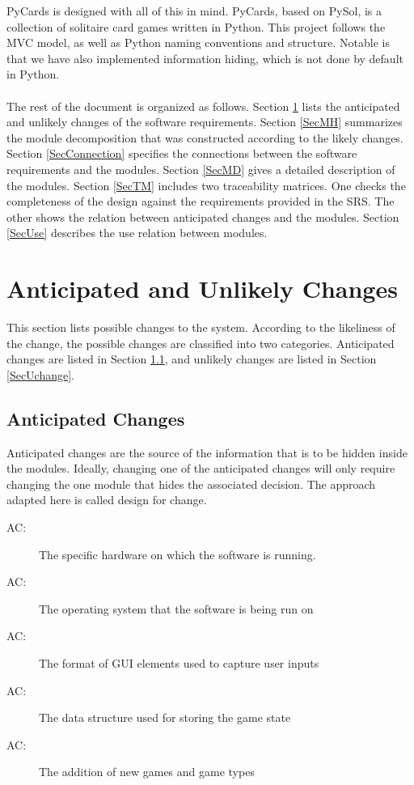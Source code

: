 \documentclass[12pt, titlepage]{article}
\newcounter{acnum}
\newcommand{\actheacnum}{AC\theacnum}
\begin{document}
	PyCards is designed with all of this in mind.  PyCards, based on PySol, is 
	a collection of solitaire card games written in Python.  This project 
	follows the MVC model, as well as Python naming conventions and structure.  
	Notable is that we have also implemented information hiding, which is not 
	done by default in Python.\\\\
	The rest of the document is organized as follows. Section \ref{SecChange} 
	lists the anticipated and unlikely changes of the software requirements. 
	Section \ref{SecMH} summarizes the module decomposition that was 
	constructed according to the likely changes. Section \ref{SecConnection} 
	specifies the connections between the software requirements and the
	modules. Section \ref{SecMD} gives a detailed description of the
	modules. Section \ref{SecTM} includes two traceability matrices. One checks
	the completeness of the design against the requirements provided in the 
	SRS. The other shows the relation between anticipated changes and the 
	modules. Section \ref{SecUse} describes the use relation between modules.
	\section{Anticipated and Unlikely Changes} \label{SecChange} This section 
	lists possible changes to the system. According to the likeliness of the 
	change, the possible changes are classified into two categories. 
	Anticipated changes are listed in Section \ref{SecAchange}, and unlikely 
	changes are listed in Section \ref{SecUchange}.
	\subsection{Anticipated Changes} \label{SecAchange}
	Anticipated changes are the source of the information that is to be hidden
	inside the modules. Ideally, changing one of the anticipated changes will 
	only require changing the one module that hides the associated decision. 
	The approach adapted here is called design for change.
	\begin{description}
		\item[ \actheacnum \label{acHardware}:] The 
		specific hardware on which the software is running.
		\item[ \actheacnum \label{acOS}:] The operating 
		system that the software is being run on
		\item[ \actheacnum \label{acGUI}:] The format of 
		GUI elements used to capture user inputs
		\item[ \actheacnum \label{acStruct}:] The data 
		structure used for storing the game state
		\item[ \actheacnum \label{acGames}:] The addition 
		of new games and game types
	\end{description}
\end{document}
